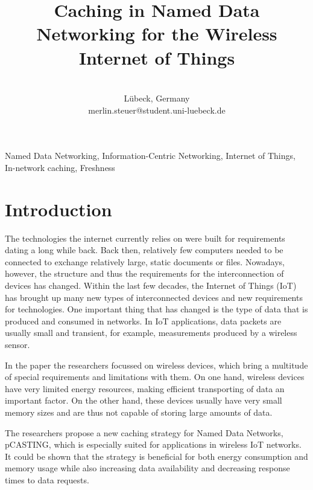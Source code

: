 \documentclass[conference]{IEEEtran}
\begin{document}
\title{Caching in Named Data Networking for the Wireless Internet of Things}

\author{
\\
Lübeck, Germany \\
merlin.steuer@student.uni-luebeck.de
}

\maketitle

\begin{abstract}
\end{abstract}

\begin{IEEEkeywords}
    Named Data Networking, Information-Centric
    Networking, Internet of Things, In-network caching, Freshness
\end{IEEEkeywords}

\section{Introduction}

The technologies the internet currently relies on were built for requirements dating a long while back. Back then, relatively few computers needed to be connected to exchange relatively large, static documents or files. Nowadays, however, the structure and thus the requirements for the interconnection of devices has changed. Within the last few decades, the Internet of Things (IoT) has brought up many new types of interconnected devices and new requirements for technologies. One important thing that has changed is the type of data that is produced and consumed in networks. In IoT applications, data packets are usually small and transient, for example, measurements produced by a wireless sensor.

In the paper the researchers focussed on wireless devices, which bring a multitude of special requirements and limitations with them. On one hand, wireless devices have very limited energy resources, making efficient transporting of data an important factor. On the other hand, these devices usually have very small memory sizes and are thus not capable of storing large amounts of data.

The researchers propose a new caching strategy for Named Data Networks, {pCASTING}, which is especially suited for applications in wireless IoT networks. It could be shown that the strategy is beneficial for both energy consumption and memory usage while also increasing data availability and decreasing response times to data requests.
\end{document}
